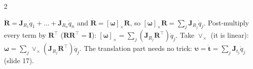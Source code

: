 \begin{multicols}{2}
\begin{fbx}
\end{fbx}
\begin{deriv}
$\dot{\mathbf R}=\mathbf J_{R_1}\dot q_1+\dots+\mathbf J_{R_n}\dot q_n$ and $\dot{\mathbf R}=[\boldsymbol\omega]_\times\mathbf R$, so $[\boldsymbol\omega]_\times\mathbf R=\sum_j\mathbf J_{R_j}\dot q_j$. Post-multiply every term by $\mathbf R^\top$ ($\mathbf R\mathbf R^\top=\mathbf I$): $[\boldsymbol\omega]_\times=\sum_j(\mathbf J_{R_j}\mathbf R^\top)\dot q_j$. Take $\vee_\times$ (it is linear): $\boldsymbol\omega=\sum_j\vee_\times(\mathbf J_{R_j}\mathbf R^\top)\dot q_j$. The translation part needs no trick: $\boldsymbol\upsilon=\dot{\mathbf t}=\sum_j\mathbf J_{t_j}\dot q_j$ (slide 17).
\end{deriv}


\end{multicols}
